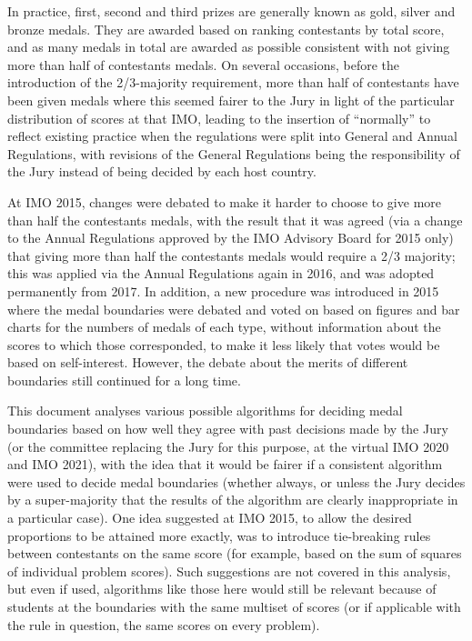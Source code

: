 \documentclass[a4paper,11pt]{article}
\begin{document}
In practice, first, second and third prizes are generally known as
gold, silver and bronze medals.  They are awarded based on ranking
contestants by total score, and as many medals in total are awarded as
possible consistent with not giving more than half of contestants
medals.  On several occasions, before the introduction of the
2/3-majority requirement, more than half of contestants have been
given medals where this seemed fairer to the Jury in light of the
particular distribution of scores at that IMO, leading to the
insertion of ``normally'' to reflect existing practice when the
regulations were split into General and Annual Regulations, with
revisions of the General Regulations being the responsibility of the
Jury instead of being decided by each host country.

At IMO 2015, changes were debated to make it harder to choose to give
more than half the contestants medals, with the result that it was
agreed (via a change to the Annual Regulations approved by the IMO
Advisory Board for 2015 only) that giving more than half the
contestants medals would require a 2/3 majority; this was
applied via the Annual Regulations again in 2016, and was adopted
permanently from 2017.  In addition, a new
procedure was introduced in 2015 where the medal boundaries were debated and
voted on based on figures and bar charts for the numbers of medals of
each type, without information about the scores to which those
corresponded, to make it less likely that votes would be based on
self-interest.  However, the debate about the merits of different
boundaries still continued for a long time.

This document analyses various possible algorithms for deciding medal
boundaries based on how well they agree with past decisions made by
the Jury (or the committee replacing the Jury for this purpose, at the
virtual IMO 2020 and IMO 2021), with the idea that it would be fairer
if a consistent
algorithm were used to decide medal boundaries (whether always, or
unless the Jury decides by a super-majority that the results of the
algorithm are clearly inappropriate in a particular case).  One idea
suggested at IMO 2015, to allow the desired proportions to be attained
more exactly, was to introduce tie-breaking rules between contestants
on the same score (for example, based on the sum of squares of
individual problem scores).  Such suggestions are not covered in this
analysis, but even if used, algorithms like those here would still be
relevant because of students at the boundaries with the same multiset
of scores (or if applicable with the rule in question, the same scores
on every problem).
\end{document}
